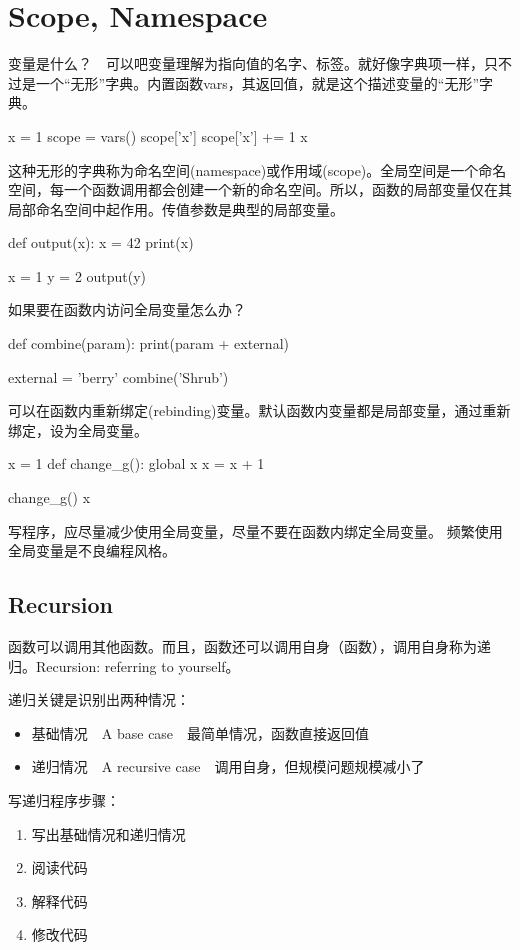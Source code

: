 \section{Scope, Namespace}
变量是什么？　可以吧变量理解为指向值的名字、标签。就好像字典项一样，只不过是一个“无形”字典。内置函数vars，其返回值，就是这个描述变量的“无形”字典。
\begin{python}
x = 1
scope = vars()
scope['x']
scope['x'] += 1
x
\end{python}
这种无形的字典称为命名空间(namespace)或作用域(scope)。全局空间是一个命名空间，每一个函数调用都会创建一个新的命名空间。所以，函数的局部变量仅在其局部命名空间中起作用。传值参数是典型的局部变量。
\begin{python}
def output(x):
    x = 42
    print(x)

x = 1
y = 2
output(y)
\end{python}
如果要在函数内访问全局变量怎么办？
\begin{python}
  def combine(param):
      print(param + external)

  external = 'berry'
  combine('Shrub')
\end{python}

可以在函数内重新绑定(rebinding)变量。默认函数内变量都是局部变量，通过重新绑定，设为全局变量。
\begin{python}
x = 1
def change_g():
    global x  
    x = x + 1

change_g()
x
\end{python}
写程序，应尽量减少使用全局变量，尽量不要在函数内绑定全局变量。 频繁使用全局变量是不良编程风格。

\subsection{Recursion}
函数可以调用其他函数。而且，函数还可以调用自身（函数），调用自身称为递归。Recursion: referring to yourself。

递归关键是识别出两种情况：
\begin{itemize}
\item 基础情况　A base case　最简单情况，函数直接返回值
\item 递归情况　A recursive case　调用自身，但规模问题规模减小了
\end{itemize}
写递归程序步骤：
\begin{enumerate}
\item 写出基础情况和递归情况
\item 阅读代码
\item 解释代码
\item 修改代码
\end{enumerate}
